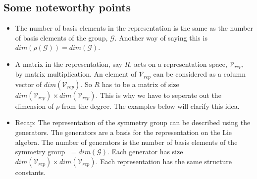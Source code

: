 \subsection{Some noteworthy points}
\begin{itemize}
  \item The number of basis elements in the representation is the same as the
    number of basis elements of the group, $\mathcal{G}$. Another way of
    saying this is $dim(\rho(\mathcal{G}))=dim(\mathcal{G})$.
  \item A matrix in the representation, say $R$, acts on a representation
    space, $\mathcal{V}_{rep}$, by matrix multiplication. An element of
    $\mathcal{V}_{rep}$ can be considered as a column vector of
    $dim(\mathcal{V}_{rep})$. So $R$ has to be a matrix of size
    $dim(\mathcal{V}_{rep})\times dim(\mathcal{V}_{rep})$. This is why
    we have to seperate out the dimension of $\rho$ from the degree. The
    examples below will clarify this idea.
  \item Recap: The representation of the symmetry group can be described using
    the generators. The generators are a basis for the representation on the
    Lie algebra. The number of generators is the number of basis elements of
    the symmetry group $\;= dim(\mathcal{G})$. Each generator has size
    $dim(\mathcal{V}_{rep})\times dim(\mathcal{V}_{rep})$. Each representation
    has the same structure constants.
\end{itemize}
